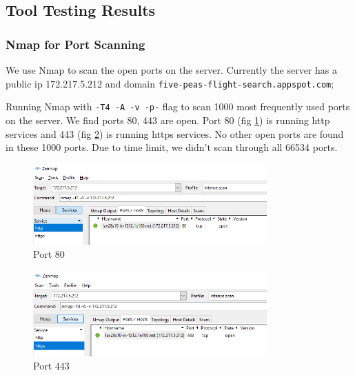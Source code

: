 \documentclass[12pt, a4paper]{article}
\newcommand{\code}[1]{\texttt{#1}}
\begin{document}


\subsection{Tool Testing Results}
\subsubsection{Nmap for Port Scanning}
We use Nmap to scan the open ports on the server. Currently the server has a public ip 172.217.5.212 and domain \code{five-peas-flight-search.\linebreak[1]appspot.com};

Running Nmap with \code{-T4 -A -v -p-} flag to scan 1000 most frequently used ports on the server.
We find ports 80, 443 are open. Port 80 (fig \ref{fig:nmap80}) is running http services and 
443 (fig \ref{fig:nmap443}) is running https services. No other open ports are found in these 1000 ports. Due to time limit, we didn't scan through all 66534 ports.

\begin{figure}[ht]
\centering
\includegraphics[width=0.8\textwidth, frame]{nmap80.png}
\caption{Port 80}
\label{fig:nmap80}
\end{figure}

\begin{figure}[ht]
\centering
\includegraphics[width=0.8\textwidth, frame]{nmap443.png}
\caption{Port 443}
\label{fig:nmap443}
\end{figure}
\end{document}
